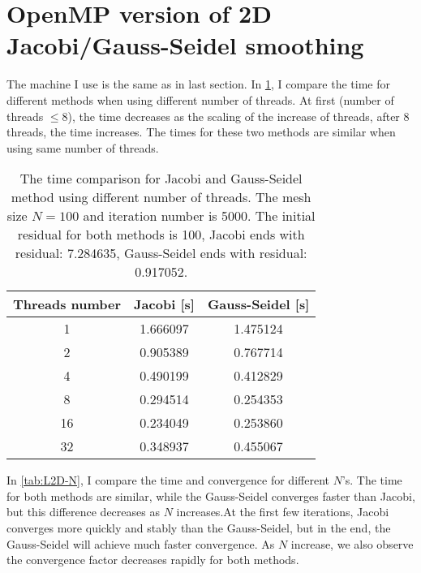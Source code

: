 \documentclass[10pt,a4paper]{article}
\theoremstyle{dotlessP}
\begin{document}
\section{OpenMP version of 2D Jacobi/Gauss-Seidel smoothing}
The machine I use is the same as in last section. In \cref{tab:L2D-100}, I compare the time for different methods when using different number of threads. At first (number of threads $\leq 8$), the time decreases as the scaling of the increase of threads, after 8 threads, the time increases. The times for these two methods are similar when using same number of threads.
\begin{table}[tbhp]
	\label{tab:L2D-100}
	\caption{The time comparison for Jacobi and Gauss-Seidel method using different number of threads. The mesh size $N=100$ and iteration number is 5000. The initial residual for both methods is 100, Jacobi ends with residual: 7.284635, Gauss-Seidel ends with residual: 0.917052.}
	\centering
	\begin{tabular}{c|c|c}
		\hline 
		Threads number & Jacobi [s]  &  Gauss-Seidel [s]\\ 
		\hline 
		1	& 1.666097 & 1.475124 \\ 
		2	& 0.905389& 0.767714 \\ 
		4	&  0.490199&  0.412829\\ 
		8 & 0.294514 & 0.254353\\
		16 & 0.234049 & 0.253860\\
		32 & 0.348937 &  0.455067 \\
		\hline 
	\end{tabular} 
\end{table}

In \cref{tab:L2D-N}, I compare the time and convergence for different $N$'s. The time for both methods are similar, while the Gauss-Seidel converges faster than Jacobi, but this difference decreases as $N$ increases.At the first few iterations, Jacobi converges more quickly and stably than the Gauss-Seidel,  but in the end, the Gauss-Seidel will achieve much faster convergence. As $N$ increase, we also observe the convergence factor decreases rapidly for both methods.
\end{document}
